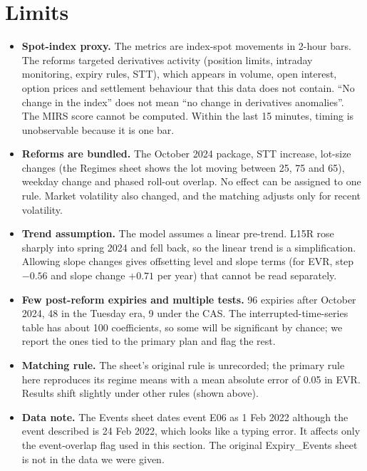 \documentclass[10pt,a4paper]{article}
\begin{document}
\section*{Limits}
\begin{itemize}
\item \textbf{Spot-index proxy.} The metrics are index-spot movements in 2-hour bars. The reforms targeted derivatives activity (position limits, intraday monitoring, expiry rules, STT), which appears in volume, open interest, option prices and settlement behaviour that this data does not contain. ``No change in the index'' does not mean ``no change in derivatives anomalies''. The MIRS score cannot be computed. Within the last 15 minutes, timing is unobservable because it is one bar.
\item \textbf{Reforms are bundled.} The October 2024 package, STT increase, lot-size changes (the Regimes sheet shows the lot moving between 25, 75 and 65), weekday change and phased roll-out overlap. No effect can be assigned to one rule. Market volatility also changed, and the matching adjusts only for recent volatility.
\item \textbf{Trend assumption.} The model assumes a linear pre-trend. L15R rose sharply into spring 2024 and fell back, so the linear trend is a simplification. Allowing slope changes gives offsetting level and slope terms (for EVR, step $-0.56$ and slope change $+0.71$ per year) that cannot be read separately.
\item \textbf{Few post-reform expiries and multiple tests.} 96 expiries after October 2024, 48 in the Tuesday era, 9 under the CAS. The interrupted-time-series table has about 100 coefficients, so some will be significant by chance; we report the ones tied to the primary plan and flag the rest.
\item \textbf{Matching rule.} The sheet's original rule is unrecorded; the primary rule here reproduces its regime means with a mean absolute error of 0.05 in EVR. Results shift slightly under other rules (shown above).
\item \textbf{Data note.} The Events sheet dates event E06 as 1 Feb 2022 although the event described is 24 Feb 2022, which looks like a typing error. It affects only the event-overlap flag used in this section. The original Expiry\_Events sheet is not in the data we were given.
\end{itemize}
\end{document}

